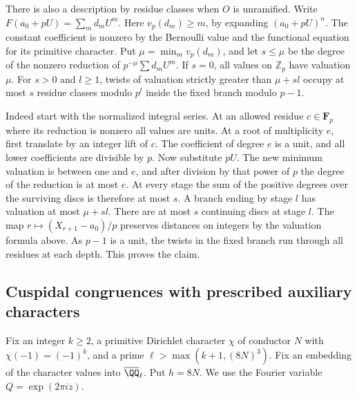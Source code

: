 \documentclass[a4paper,11pt]{article}
\theoremstyle{definition}
\theoremstyle{remark}
\newcommand{\ZZ}{\mathbb Z}\newcommand{\ord}{\operatorname{ord}}
\numberwithin{equation}{section}
\begin{document}
There is also a description by residue classes when \(O\) is
unramified. Write \(F(a_0+pU)=\sum_m d_mU^m\). Here
\(v_p(d_m)\ge m\), by expanding \((a_0+pU)^n\). The constant
coefficient is nonzero by the Bernoulli value and the functional
equation for its primitive character. Put
\(\mu=\min_m v_p(d_m)\), and let \(s\le\mu\) be the degree of
the nonzero reduction of \(p^{-\mu}\sum d_mU^m\).
If \(s=0\), all values on \(\ZZ_p\) have valuation \(\mu\).
For \(s>0\) and \(l\ge1\), twists of valuation
strictly greater than \(\mu+sl\) occupy at most \(s\) residue
classes modulo \(p^l\) inside the fixed branch modulo \(p-1\).

Indeed start with the normalized integral series. At an allowed
residue \(c\in\mathbf F_p\) where its reduction is nonzero all
values are units. At a root of multiplicity \(e\), first translate
by an integer lift of \(c\). The coefficient of degree \(e\) is
a unit, and all lower coefficients are divisible by \(p\).
Now substitute \(pU\). The new minimum valuation is between
one and \(e\), and after division by that power of \(p\) the
degree of the reduction is at most \(e\). At every stage the
sum of the positive degrees over the surviving discs is
therefore at most \(s\). A branch ending by stage \(l\) has
valuation at most \(\mu+sl\). There are at most \(s\) continuing
discs at stage \(l\). The map \(r\mapsto (X_{r+1}-a_0)/p\)
preserves distances on integers by the valuation formula above.
As \(p-1\) is a unit, the twists in the fixed branch run through
all residues at each depth. This proves the claim.

\subsection{Cuspidal congruences with prescribed auxiliary characters}\label{nav:III-36}
Fix an integer \(k\ge2\), a primitive Dirichlet character \(\chi\)
of conductor \(N\) with \(\chi(-1)=(-1)^k\), and a prime
\(\ell>\max(k+1,(8N)^3)\). Fix an embedding of the character
values into \(\overline{\QQ}_\ell\). Put \(h=8N\).
We use the Fourier variable \(Q=\exp(2\pi i z)\).
\end{document}
